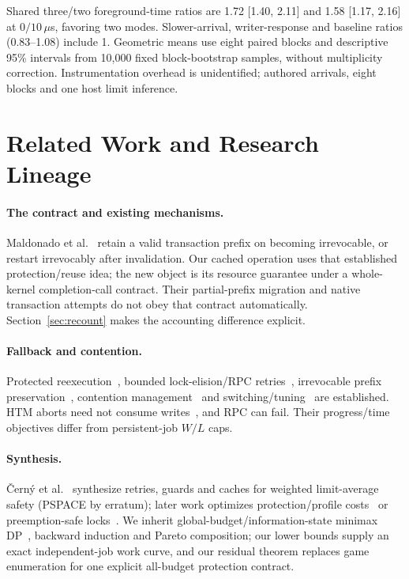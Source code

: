 \documentclass[acmsmall,screen,review,anonymous]{acmart}
\begin{document}
Shared three/two foreground-time ratios are 1.72 [1.40, 2.11] and 1.58 [1.17, 2.16] at $0/10\,\mu$s, favoring two modes. Slower-arrival, writer-response and baseline ratios (0.83--1.08) include 1. Geometric means use eight paired blocks and descriptive 95\% intervals from 10,000 fixed block-bootstrap samples, without multiplicity correction. Instrumentation overhead is unidentified; authored arrivals, eight blocks and one host limit inference.

\section{Related Work and Research Lineage}
\label{sec:related}

\paragraph{The contract and existing mechanisms.}
Maldonado et al.~\cite[Section~III.D]{maldonado2011} retain a valid transaction prefix on becoming irrevocable, or restart irrevocably after invalidation. Our cached operation uses that established protection/reuse idea; the new object is its resource guarantee under a whole-kernel completion-call contract. Their partial-prefix migration and native transaction attempts do not obey that contract automatically. Section~\ref{sec:recount} makes the accounting difference explicit.

\paragraph{Fallback and contention.}
Protected reexecution~\cite[Section~3.3]{kung}, bounded lock-elision/RPC retries~\cite{glibcElision,hotspotRTM,ulrichRetries,envoyRetries}, irrevocable prefix preservation~\cite{welc2008}, contention management~\cite{attiya 2006,guerraoui2005,alistarh2018} and switching/tuning~\cite{lim1994,usui2010,diegues2014} are established. HTM aborts need not consume writes~\cite{gccRTM}, and RPC can fail. Their progress/time objectives differ from persistent-job $W/L$ caps.

\paragraph{Synthesis.}
\v{C}ern\'y et al.~\cite{cerny} synthesize retries, guards and caches for weighted limit-average safety (PSPACE by erratum); later work optimizes protection/profile costs~\cite{cernyquality} or preemption-safe locks~\cite{cernysafe}. We inherit global-budget/information-state minimax DP~\cite{mannor,postek,dave}, backward induction and Pareto composition; our lower bounds supply an exact independent-job work curve, and our residual theorem replaces game enumeration for one explicit all-budget protection contract.
\end{document}
